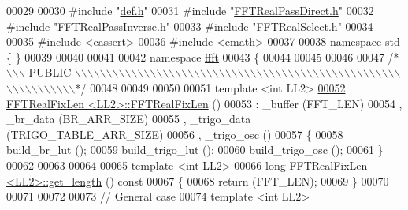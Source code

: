 \begin{DoxyCode}
00029 
00030 \textcolor{preprocessor}{#include    "\hyperlink{a00089}{def.h}"}
00031 \textcolor{preprocessor}{#include    "\hyperlink{a00100}{FFTRealPassDirect.h}"}
00032 \textcolor{preprocessor}{#include    "\hyperlink{a00102}{FFTRealPassInverse.h}"}
00033 \textcolor{preprocessor}{#include    "\hyperlink{a00104}{FFTRealSelect.h}"}
00034 
00035 \textcolor{preprocessor}{#include    <cassert>}
00036 \textcolor{preprocessor}{#include    <cmath>}
00037 
\hypertarget{a00098_source_l00038}{}\hyperlink{a00144}{00038} \textcolor{keyword}{namespace }\hyperlink{a00144}{std} \{ \}
00039 
00040 
00041 
00042 \textcolor{keyword}{namespace }\hyperlink{a00142}{ffft}
00043 \{
00044 
00045 
00046 
00047 \textcolor{comment}{/*\(\backslash\)\(\backslash\)\(\backslash\) PUBLIC \(\backslash\)\(\backslash\)\(\backslash\)\(\backslash\)\(\backslash\)\(\backslash\)\(\backslash\)\(\backslash\)\(\backslash\)\(\backslash\)\(\backslash\)\(\backslash\)\(\backslash\)\(\backslash\)\(\backslash\)\(\backslash\)\(\backslash\)\(\backslash\)\(\backslash\)\(\backslash\)\(\backslash\)\(\backslash\)\(\backslash\)\(\backslash\)\(\backslash\)\(\backslash\)\(\backslash\)\(\backslash\)\(\backslash\)\(\backslash\)\(\backslash\)\(\backslash\)\(\backslash\)\(\backslash\)\(\backslash\)\(\backslash\)\(\backslash\)\(\backslash\)\(\backslash\)\(\backslash\)\(\backslash\)\(\backslash\)\(\backslash\)\(\backslash\)\(\backslash\)\(\backslash\)\(\backslash\)\(\backslash\)\(\backslash\)\(\backslash\)\(\backslash\)\(\backslash\)\(\backslash\)\(\backslash\)\(\backslash\)\(\backslash\)\(\backslash\)\(\backslash\)\(\backslash\)\(\backslash\)\(\backslash\)\(\backslash\)\(\backslash\)*/}
00048 
00049 
00050 
00051 \textcolor{keyword}{template} <\textcolor{keywordtype}{int} LL2>
\hypertarget{a00098_source_l00052}{}\hyperlink{a00011_ac94c40796b1e5211383357a65738319d}{00052} \hyperlink{a00011}{FFTRealFixLen <LL2>::FFTRealFixLen} ()
00053 :   \_buffer (FFT\_LEN)
00054 ,   \_br\_data (BR\_ARR\_SIZE)
00055 ,   \_trigo\_data (TRIGO\_TABLE\_ARR\_SIZE)
00056 ,   \_trigo\_osc ()
00057 \{
00058     build\_br\_lut ();
00059     build\_trigo\_lut ();
00060     build\_trigo\_osc ();
00061 \}
00062 
00063 
00064 
00065 \textcolor{keyword}{template} <\textcolor{keywordtype}{int} LL2>
\hypertarget{a00098_source_l00066}{}\hyperlink{a00011_a73770aaf1fb19877d116adfcfcd69e26}{00066} \textcolor{keywordtype}{long}    \hyperlink{a00011}{FFTRealFixLen <LL2>::get\_length} () \textcolor{keyword}{const}
00067 \{
00068     \textcolor{keywordflow}{return} (FFT\_LEN);
00069 \}
00070 
00071 
00072 
00073 \textcolor{comment}{// General case}
00074 \textcolor{keyword}{template} <\textcolor{keywordtype}{int} LL2>

\end{DoxyCode}
